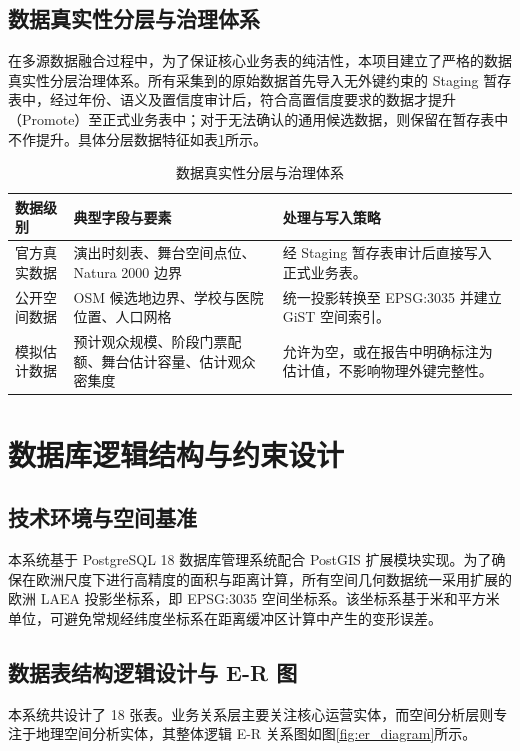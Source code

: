 \documentclass[11pt,a4paper,fontset=fandol]{ctexart}
\begin{document}
\subsection{数据真实性分层与治理体系}

在多源数据融合过程中，为了保证核心业务表的纯洁性，本项目建立了严格的数据真实性分层治理体系。所有采集到的原始数据首先导入无外键约束的 Staging 暂存表中，经过年份、语义及置信度审计后，符合高置信度要求的数据才提升（Promote）至正式业务表中；对于无法确认的通用候选数据，则保留在暂存表中不作提升。具体分层数据特征如表\ref{tab:data_quality}所示。

\begin{table}[H]
\centering
\caption{数据真实性分层与治理体系}
\label{tab:data_quality}
\begin{tabularx}{\textwidth}{lXX}
\toprule
数据级别 & 典型字段与要素 & 处理与写入策略 \\
\midrule
官方真实数据 & 演出时刻表、舞台空间点位、Natura 2000 边界 & 经 Staging 暂存表审计后直接写入正式业务表。 \\
公开空间数据 & OSM 候选地边界、学校与医院位置、人口网格 & 统一投影转换至 EPSG:3035 并建立 GiST 空间索引。 \\
模拟估计数据 & 预计观众规模、阶段门票配额、舞台估计容量、估计观众密集度 & 允许为空，或在报告中明确标注为估计值，不影响物理外键完整性。 \\
\bottomrule
\end{tabularx}
\end{table}

\section{数据库逻辑结构与约束设计}

\subsection{技术环境与空间基准}

本系统基于 PostgreSQL 18 数据库管理系统配合 PostGIS 扩展模块实现。为了确保在欧洲尺度下进行高精度的面积与距离计算，所有空间几何数据统一采用扩展的欧洲 LAEA 投影坐标系，即 EPSG:3035 空间坐标系。该坐标系基于米和平方米单位，可避免常规经纬度坐标系在距离缓冲区计算中产生的变形误差。

\subsection{数据表结构逻辑设计与 E-R 图}

本系统共设计了 18 张表。业务关系层主要关注核心运营实体，而空间分析层则专注于地理空间分析实体，其整体逻辑 E-R 关系图如图\ref{fig:er_diagram}所示。
\end{document}
